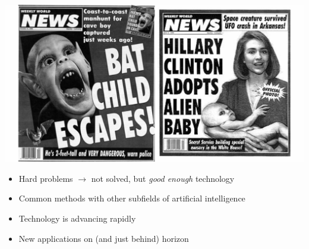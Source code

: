 \documentclass[landscape]{jhuslides3C}
\begin{document}

\vfill
\begin{center}
\includegraphics[width=25cm]{fake-news3.png}
\end{center}
\vfill


\vfill
\begin{itemize}
\item Hard problems $\rightarrow$ not solved, but {\em good enough} technology
\item Common methods with other subfields of artificial intelligence
\item Technology is advancing rapidly
\item New applications on (and just behind) horizon
\end{itemize}
\vfill

\end{document}

